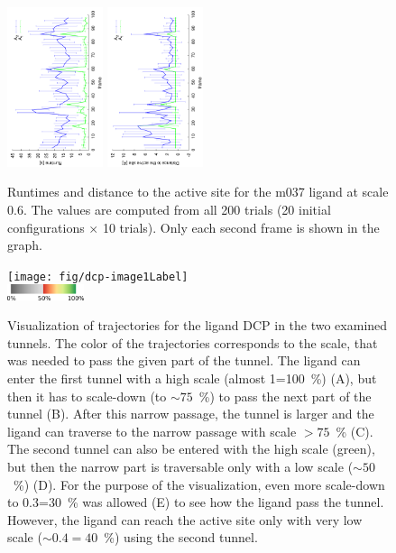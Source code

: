 \documentclass[usletter, 10pt, conference]{ieeeconf} %
\begin{document}
{\def\a{270}
\begin{figure}
\centering
\includegraphics[width=0.25\textwidth,angle=\a]{fig/m037tmins-03tunnel-1rrt_path_time-2}
\includegraphics[width=0.25\textwidth,angle=\a]{fig/m037tmins-03tunnel-1trajDistToGoal-2}
\caption{\label{fig::comparison}
    Runtimes and distance to the active site for the m037 ligand at scale 0.6.
    The values are computed from all 200 trials (20 initial configurations $\times$ 10 trials).
    Only each second frame is shown in the graph.
}
\end{figure}
}


\begin{figure}
\centering
\texttt{[image: fig/dcp-image1Label]}\\
\includegraphics[width=0.2\textwidth]{fig/colormap}
\caption{\label{fig::dcp}
Visualization of trajectories for the ligand DCP   in the two examined tunnels.  
The color of the trajectories corresponds to the scale, that was needed to pass the given part of the tunnel.
The ligand can enter the first tunnel with a high scale (almost 1=100~\%) (A), but then it has to scale-down (to $\sim75$~\%) to pass the
next part of the tunnel (B). After this narrow passage, the tunnel is larger and the ligand can traverse to the narrow passage with
scale $>75$~\% (C).
The second tunnel can also be entered with the high scale (green), but then the narrow part is traversable only with a low scale ($\sim50$~\%) (D). 
For the purpose of the visualization, even more scale-down to 0.3=30~\% was allowed (E) to see how the ligand pass the tunnel.
However, the ligand can reach the active site only with very low scale ($\sim0.4=40$~\%) using the second tunnel.
}
\end{figure}
\end{document}
